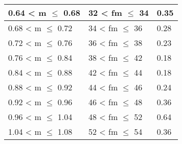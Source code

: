 \begin{table}[ht!]
\begin{tabular}{|l|l|l|}
		0.64 < m $\leq$ 0.68                                                                            & 32 < fm $\leq$ 34                                                                                                    & 0.35                        \\ \hline
		0.68 < m $\leq$ 0.72                                                                            & 34 < fm $\leq$ 36                                                                                                    & 0.28                        \\ \hline
		0.72 < m $\leq$ 0.76                                                                            & 36 < fm $\leq$ 38                                                                                                    & 0.23                        \\ \hline
		0.76 < m $\leq$ 0.84                                                                            & 38 < fm $\leq$ 42                                                                                                    & 0.18                        \\ \hline
		0.84 < m $\leq$ 0.88                                                                            & 42 < fm $\leq$ 44                                                                                                    & 0.18                        \\ \hline
		0.88 < m $\leq$ 0.92                                                                            & 44 < fm $\leq$ 46                                                                                                    & 0.24                        \\ \hline
		0.92 < m $\leq$ 0.96                                                                            & 46 < fm $\leq$ 48                                                                                                    & 0.36                        \\ \hline
		0.96 < m $\leq$ 1.04                                                                            & 48 < fm $\leq$ 52                                                                                                    & 0.64                        \\ \hline
		1.04 < m $\leq$ 1.08                                                                            & 52 < fm $\leq$ 54                                                                                                    & 0.36                        \\ \hline

\end{tabular}
\end{table}
